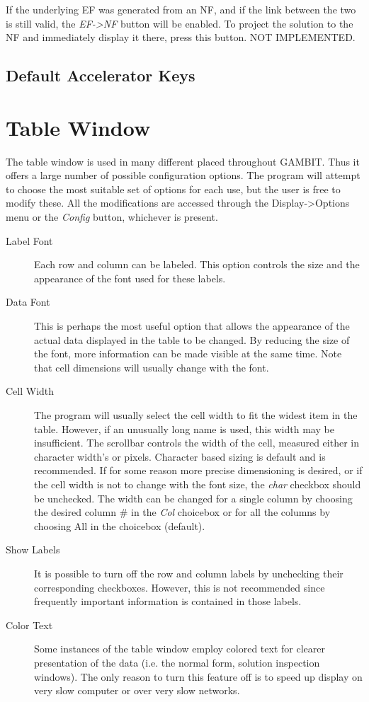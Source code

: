 If the underlying EF was generated from an NF, and if the link between the two is still
valid, the {\em EF->NF} button will be enabled.  To project the solution to the NF and
immediately display it there, press this button.  NOT IMPLEMENTED.
 

\subsection{Default Accelerator Keys}\label{ExtFormDefAccl}


\section{Table Window}\label{TableWindow}
The table window is used in many different placed throughout GAMBIT.  Thus
it offers a large number of possible configuration options.  The program
will attempt to choose the most suitable set of options for each use, but
the user is free to modify these.  All the modifications are accessed
through the Display->Options menu or the {\em Config} button, whichever is
present.

\begin{description}
\item[Label Font] Each row and column can be labeled.  This option controls
the size and the appearance of the font used for these labels.
\item[Data Font] This is perhaps the most useful option that allows the 
appearance of the actual data displayed in the table to be changed.  By
reducing the size of the font, more information can be made visible at the
same time.  Note that cell dimensions will usually change with the font.
\item[Cell Width] The program will usually select the cell width to fit the
widest item in the table.  However, if an unusually long name is used,
this width may be insufficient.  The scrollbar controls the width of the
cell, measured either in character width's or pixels.  Character based
sizing is default and is recommended.  If for some reason more precise
dimensioning is desired, or if the cell width is not to change with the
font size, the {\em char} checkbox should be unchecked.  The width can be
changed for a single column by choosing the desired column \# in the {\em
Col} choicebox or for all the columns by choosing All in the choicebox
(default).
\item[Show Labels] It is possible to turn off the row and column labels by 
unchecking their corresponding checkboxes.  However, this is not
recommended since frequently important information is contained in those
labels.
\item[Color Text] Some instances of the table window employ colored text 
for clearer presentation of the data (i.e. the normal form, solution
inspection windows).  The only reason to turn this feature off is to speed
up display on very slow computer or over very slow networks.
\end{description}


